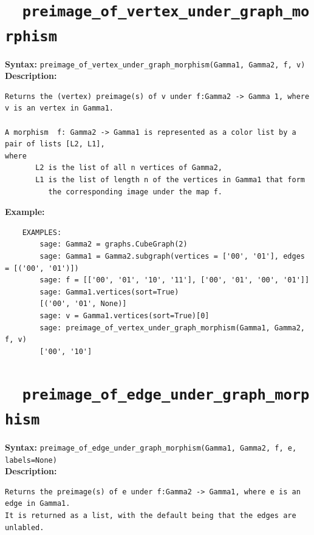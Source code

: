\documentclass{article}
\begin{document}
\section{\tt \ \ preimage\_of\_vertex\_under\_graph\_morphism}

\textbf{Syntax:} \verb}preimage_of_vertex_under_graph_morphism(Gamma1, Gamma2, f, v)}\\

\textbf{Description:}
\begin{verbatim}
Returns the (vertex) preimage(s) of v under f:Gamma2 -> Gamma 1, where v is an vertex in Gamma1.

A morphism  f: Gamma2 -> Gamma1 is represented as a color list by a pair of lists [L2, L1],
where 
       L2 is the list of all n vertices of Gamma2,
       L1 is the list of length n of the vertices in Gamma1 that form 
          the corresponding image under the map f.
\end{verbatim}

\textbf{Example:}
\begin{verbatim}
    EXAMPLES:
        sage: Gamma2 = graphs.CubeGraph(2)
        sage: Gamma1 = Gamma2.subgraph(vertices = ['00', '01'], edges = [('00', '01')])
        sage: f = [['00', '01', '10', '11'], ['00', '01', '00', '01']]
        sage: Gamma1.vertices(sort=True)
        [('00', '01', None)]
        sage: v = Gamma1.vertices(sort=True)[0]
        sage: preimage_of_vertex_under_graph_morphism(Gamma1, Gamma2, f, v)
        ['00', '10']
\end{verbatim}

\section{\tt \ \ preimage\_of\_edge\_under\_graph\_morphism}
\textbf{Syntax:} \verb}preimage_of_edge_under_graph_morphism(Gamma1, Gamma2, f, e, labels=None)}\\

\textbf{Description:}
\begin{verbatim}
Returns the preimage(s) of e under f:Gamma2 -> Gamma1, where e is an edge in Gamma1. 
It is returned as a list, with the default being that the edges are unlabled.
\end{verbatim}
\end{document}
